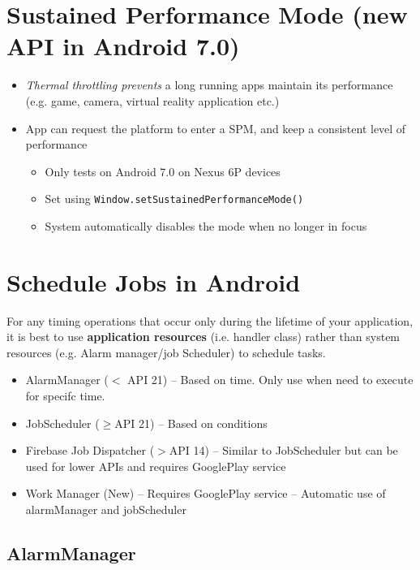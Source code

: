 \documentclass{article}
\begin{document}
\section{Sustained Performance Mode (new API in Android 7.0)}
\begin{itemize}
  \item \textit{Thermal throttling prevents} a long running apps maintain its performance (e.g. game, camera, virtual reality application etc.) 
  \item App can request the platform to enter a SPM, and keep a consistent level of performance
  \begin{itemize}
    \item Only tests on Android 7.0 on Nexus 6P devices 
    \item Set using \verb|Window.setSustainedPerformanceMode()|
    \item System automatically disables the mode when no longer in focus
  \end{itemize}
\end{itemize}

\section{Schedule Jobs in Android}

\begin{flushleft}
For any timing operations that occur only during the lifetime of your application, it is best to use \textbf{application resources} (i.e. handler class) rather than system resources (e.g. Alarm manager/job Scheduler) to schedule tasks.
\end{flushleft}
\begin{itemize}  
  \item AlarmManager ($ < $ API 21) – Based on time. Only use when need to execute for specifc time.
  \item JobScheduler ($ \geq $API 21) – Based on conditions 
  \item Firebase Job Dispatcher ($ > $API 14) – Similar to JobScheduler but can be used for lower APIs and requires GooglePlay service 
  \item Work Manager (New) – Requires GooglePlay service – Automatic use of alarmManager and jobScheduler
\end{itemize}

\subsection{AlarmManager}
\end{document}
